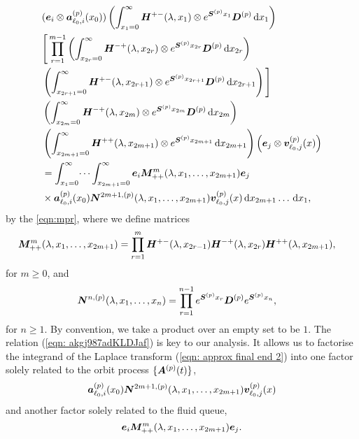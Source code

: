\begin{align}
	&(\bs e_i \otimes \bs   a_{\ell_0,i}^{(p)}(x_0)) \left( \int_{x_1=0}^\infty \bs H^{+-}(\lambda,x_1)\otimes e^{\bs{S}^{(p)}x_1}\bs{D}^{(p)}\wrt x_1 \right)\nonumber%
	\\&\Bigg[\prod_{r=1}^{m-1} \left(\int_{x_{2r}=0}^\infty \bs H^{-+}(\lambda,x_{2r}) \otimes e^{\bs{S}^{(p)}x_{2r}}\bs{D}^{(p)}\wrt x_{2r}\right) \nonumber 
	\\&\nonumber \left(\int_{x_{2r+1}=0}^\infty \bs H^{+-}(\lambda,x_{2r+1})
	\otimes e^{\bs{S}^{(p)}x_{2r+1}}\bs{D}^{(p)} \wrt x_{2r+1} \right)\Bigg] 
	\\&\left(\int_{x_{2m}=0}^\infty \bs H^{-+}(\lambda,x_{2m})
	  \otimes e^{\bs{S}^{(p)}x_{2m}}\bs{D}^{(p)} \wrt x_{2m} \right) \nonumber 
	\\&\left(\int_{x_{2m+1}=0}^\infty \bs H^{++}(\lambda,x_{2m+1})\otimes 
	e^{\bs{S}^{(p)}x_{2m+1}} \wrt x_{2m+1}\right) \left(\bs e_j \otimes {\bs v}_{\ell_0,j}^{(p)}(x)\right) \nonumber
	\\&=\int_{x_1=0}^\infty \dots \int_{x_{2m+1}=0}^\infty \bs e_i\bs M^{m}_{++}(\lambda,x_1,\dots,x_{2m+1})\bs e_j \nonumber 
	\\&\times \bs a_{\ell_0,i}^{(p)}(x_0) \bs N^{2m+1,(p)}(\lambda,x_1,\dots,x_{2m+1}) {\bs v}_{\ell_0,j}^{(p)}( x)\wrt x_{2m+1}\dots\wrt x_1 ,
	 \label{eqn: approx final end 2}
\end{align}
by the \ref{eqn:mpr}, where we define matrices 
\begin{align}
	&\boldsymbol M^{m}_{++}(\lambda,x_1,\dots,x_{2m+1}) \nonumber 
	= \prod_{r=1}^{m}\boldsymbol H^{+-}(\lambda,x_{2r-1})\boldsymbol H^{-+}(\lambda,x_{2r})  
	\boldsymbol H^{++}(\lambda,x_{2m+1}),\nonumber 
\end{align}
for \(m\geq 0\), and
\begin{align}
	\boldsymbol N^{n,(p)}(\lambda,x_1,\dots,x_{n}) &= \prod_{r=1}^{n-1} e^{\boldsymbol{S}^{(p)}x_{r}}\boldsymbol{D}^{(p)} e^{\boldsymbol{S}^{(p)}x_{n}}, \nonumber 
\end{align}
for \(n\geq 1\). By convention, we take a product over an empty set to be \(1\). The relation (\ref{eqn: akgj987adKLDJaf}) is key to our analysis. It allows us to factorise the integrand of the Laplace transform (\ref{eqn: approx final end 2}) into one factor solely related to the orbit process \(\{\boldsymbol A^{(p)}(t)\}\), 
\[\boldsymbol a_{\ell_0,i}^{(p)}(x_0) \boldsymbol N^{2m+1,(p)}(\lambda,x_1,\dots,x_{2m+1}) {\boldsymbol v}_{\ell_0,j}^{(p)}( x)\] 
and another factor solely related to the fluid queue,
\[\boldsymbol e_i\boldsymbol M^{m}_{++}(\lambda,x_1,\dots,x_{2m+1})\boldsymbol e_j.\] 

